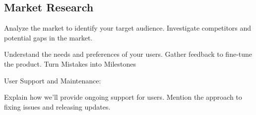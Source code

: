 
\subsection{Market Research}

Analyze the market to identify your target audience.
Investigate competitors and potential gaps in the market.

Understand the needs and preferences of your users.
Gather feedback to fine-tune the product. Turn Mistakes into Milestones

User Support and Maintenance:

    Explain how we'll provide ongoing support for users.
    Mention the approach to fixing issues and releasing updates.